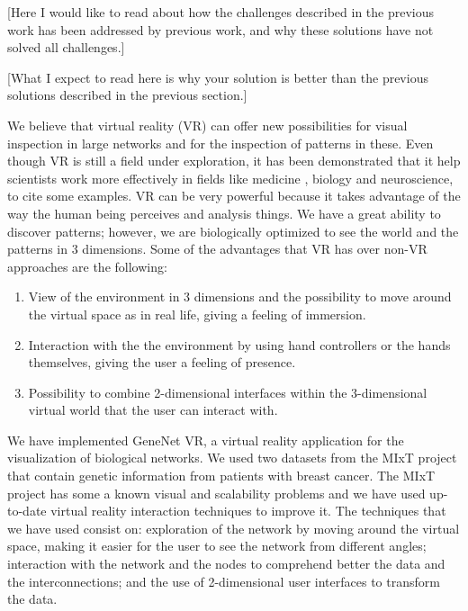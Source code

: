 
[Here I would like to read about how the challenges described in the previous work has been addressed by previous work, and why these solutions have not solved all challenges.]

[What I expect to read here is why your solution is better than the previous solutions described in the previous section.]

We believe that virtual reality (VR) can offer new possibilities for visual inspection in large networks and for the inspection of patterns in these. Even though VR is still a field under exploration, it has been demonstrated that it help scientists work more effectively in fields like medicine \cite{Laver11}\cite{xia_ip_samman_wong_gateno_wang_yeung_kot_tideman_2001}\cite{brain_damage_rehab}, biology\cite{10.1093/bioinformatics/bti581}\cite{thorley_lawson_duca_shapiro_2008} and neuroscience\cite{bohil_alicea_biocca_2011}\cite{minderer_harvey_donato_moser_2016}, to  cite some examples. VR can be very powerful because it takes advantage of the way the human being perceives and analysis things. We have a great ability to discover patterns; however, we are biologically optimized to see the world and the patterns in 3 dimensions. Some of the advantages that VR has over non-VR approaches are the following:

\begin{enumerate}
  \item View of the environment in 3 dimensions and the possibility to move around the virtual space as in real life, giving a feeling of immersion.
  \item Interaction with the the environment by using hand controllers or the hands themselves, giving the user a feeling of presence.
  \item Possibility to combine 2-dimensional interfaces within the 3-dimensional virtual world that the user can interact with.
\end{enumerate}

We have implemented GeneNet VR, a virtual reality application for the visualization of biological networks. We used two datasets from the MIxT project \cite{dumeaux_fjukstad_interactions_tumor_blood} that contain genetic information from patients with breast cancer. The MIxT project has some a known visual and scalability problems and we have used up-to-date virtual reality interaction techniques to improve it. The techniques that we have used consist on: exploration of the network by moving around the virtual space, making it easier for the user to see the network from different angles; interaction with the network and the nodes to comprehend better the data and the interconnections; and the use of 2-dimensional user interfaces to transform the data.

